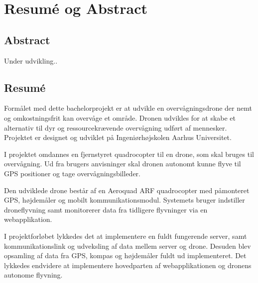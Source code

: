 \chapter{Resumé og Abstract}
\label{chap:resume}


\section*{Abstract}

Under udvikling..


\section*{Resumé}

Formålet med dette bachelorprojekt er at udvikle en overvågningsdrone der nemt og omkostningsfrit kan overvåge et område. Dronen udvikles for at skabe et alternativ til dyr og ressourcekrævende overvågning udført af mennesker.
Projektet er designet og udviklet på Ingeniørhøjskolen Aarhus Universitet.

I projektet omdannes en fjernstyret quadrocopter til en drone, som skal bruges til overvågning. Ud fra brugers anvisninger skal dronen autonomt kunne flyve til GPS positioner og tage overvågningsbilleder.  

Den udviklede drone består af en Aeroquad ARF quadrocopter med påmonteret GPS, højdemåler og mobilt kommunikationsmodul. Systemets bruger indstiller droneflyvning samt monitorerer data fra tidligere flyvninger via en webapplikation.  

I projektforløbet lykkedes det at implementere en fuldt fungerende server, samt kommunikationslink og udveksling af data mellem server og drone. Desuden blev opsamling af data fra GPS, kompas og højdemåler fuldt ud implementeret. Det lykkedes endvidere at implementere hovedparten af webapplikationen og dronens autonome flyvning.






